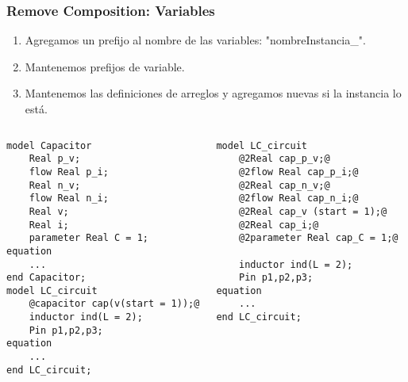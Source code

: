 \begin{frame}[fragile]
\frametitle{Remove Composition: Variables} 
\begin{enumerate}
\item Agregamos un prefijo al nombre de las variables: "nombreInstancia\_".
\item Mantenemos prefijos de variable. 
\item Mantenemos las definiciones de arreglos y agregamos nuevas si la instancia lo está.   
\end{enumerate}

\pause
\begin{columns} 
\begin{lstlisting}[style=base,basicstyle=\scriptsize]
model Capacitor 
    Real p_v;
    flow Real p_i;
    Real n_v;
    flow Real n_i; 
    Real v;
    Real i;
    parameter Real C = 1;
equation 
    ...
end Capacitor;
model LC_circuit
    @capacitor cap(v(start = 1));@
    inductor ind(L = 2);
    Pin p1,p2,p3;
equation
    ...
end LC_circuit;
\end{lstlisting}
\begin{lstlisting}[style=base,basicstyle=\scriptsize]
model LC_circuit
    @2Real cap_p_v;@
    @2flow Real cap_p_i;@
    @2Real cap_n_v;@
    @2flow Real cap_n_i;@ 
    @2Real cap_v (start = 1);@
    @2Real cap_i;@
    @2parameter Real cap_C = 1;@
    
    inductor ind(L = 2);
    Pin p1,p2,p3;
equation
    ...
end LC_circuit;
\end{lstlisting}
\end{columns}


\end{frame}


